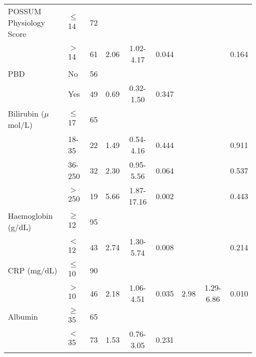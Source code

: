 \begin{sidewaystable}[p]
\begin{tabular}{|l l c| c c c| c c c|}
		POSSUM Physiology Score & $\leq$ 14 & 72     &      &            &            &      &            &  \\
		                        & $>$ 14    & 61     & 2.06 & 1.02-4.17  & 0.044      &      &            & 0.164      \\
		PBD                     & No        & 56     &      &            &            &      &            &  \\
		                        & Yes       & 49     & 0.69 & 0.32-1.50  & 0.347      &      &            &  \\
		Bilirubin ($\mu$mol/L)  & $\leq$ 17 & 65     &      &            &            &      &            &  \\
		                        & 18-35     & 22     & 1.49 & 0.54-4.16  & 0.444      &      &            & 0.911      \\
		                        & 36-250    & 32     & 2.30 & 0.95-5.56  & 0.064      &      &            & 0.537      \\
		                        & $>$ 250   & 19     & 5.66 & 1.87-17.16 & 0.002      &      &            & 0.443      \\
		Haemoglobin (g/dL)      & $\geq$ 12 & 95     &      &            &            &      &            &  \\
		                        & $<$ 12    & 43     & 2.74 & 1.30-5.74  & 0.008      &      &            & 0.214      \\
		CRP (mg/dL)             & $\leq$ 10 & 90     &      &            &            &      &            &  \\
		                        & $>$ 10    & 46     & 2.18 & 1.06-4.51  & 0.035      & 2.98 & 1.29-6.86  & 0.010      \\
		Albumin                 & $\geq$ 35 & 65     &      &            &            &      &            &  \\
		                        & $<$ 35    & 73     & 1.53 & 0.76-3.05  & 0.231      &      &            &  \\ \hline
	\end{tabular}
\end{sidewaystable}